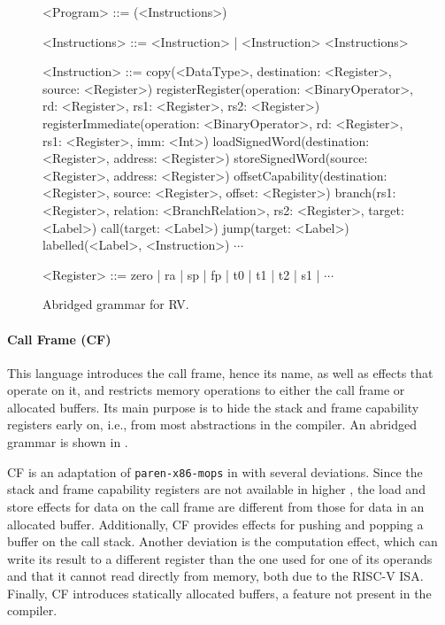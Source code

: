 \documentclass[main.tex]{subfiles}
\begin{document}
\begin{figure}[ht]
	\begin{grammar}
		
		<Program> ::= (<Instructions>)
		
		<Instructions> ::= <Instruction> | <Instruction> <Instructions>
		
		<Instruction> ::= copy(<DataType>, destination: <Register>, source: <Register>)
			\alt registerRegister(operation: <BinaryOperator>, rd: <Register>, rs1: <Register>, rs2: <Register>)
			\alt registerImmediate(operation: <BinaryOperator>, rd: <Register>, rs1: <Register>, imm: <Int>)
			\alt loadSignedWord(destination: <Register>, address: <Register>)
			\alt storeSignedWord(source: <Register>, address: <Register>)
			\alt offsetCapability(destination: <Register>, source: <Register>, offset: <Register>)
			\alt branch(rs1: <Register>, relation: <BranchRelation>, rs2: <Register>, target: <Label>)
			\alt call(target: <Label>)
			\alt jump(target: <Label>)
			\alt labelled(<Label>, <Instruction>)
			\alt $\cdots$
			
		<Register> ::= zero | ra | sp | fp | t0 | t1 | t2 | s1 | $\cdots$
		
	\end{grammar}
	\caption{Abridged grammar for RV.}
	\label{bnf:rv}
\end{figure}

\paragraph{Call Frame (CF)} This language introduces the call frame, hence its name, as well as effects that operate on it, and restricts memory operations to either the call frame or allocated buffers. Its main purpose is to hide the stack and frame capability registers early on, i.e., from most abstractions in the compiler. An abridged grammar is shown in .

CF is an adaptation of \texttt{paren-x86-mops} in \cite{:compcourse} with several deviations. Since the stack and frame capability registers are not available in higher \ils{}, the load and store effects for data on the call frame are different from those for data in an allocated buffer. Additionally, CF provides effects for pushing and popping a buffer on the call stack. Another deviation is the computation effect, which can write its result to a different register than the one used for one of its operands and that it cannot read directly from memory, both due to the RISC-V ISA. Finally, CF introduces statically allocated buffers, a feature not present in the \cite{:compcourse} compiler.
\end{document}
